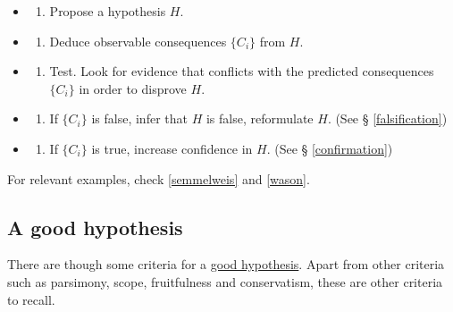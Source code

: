 \documentclass[
]{book}
\providecommand{\tightlist}{%
  \setlength{\itemsep}{0pt}\setlength{\parskip}{0pt}}
\begin{document}
\begin{itemize}
\item
  \begin{enumerate}
  \def\labelenumi{\arabic{enumi}.}
  \tightlist
  \item
    Propose a hypothesis \(H\).
  \end{enumerate}
\item
  \begin{enumerate}
  \def\labelenumi{\arabic{enumi}.}
  \setcounter{enumi}{1}
  \tightlist
  \item
    Deduce observable consequences \(\{C_i\}\) from \(H\).
  \end{enumerate}
\item
  \begin{enumerate}
  \def\labelenumi{\arabic{enumi}.}
  \setcounter{enumi}{2}
  \tightlist
  \item
    Test. Look for evidence that conflicts with the predicted consequences \(\{C_i\}\) in order to disprove \(H\).
  \end{enumerate}
\item
  \begin{enumerate}
  \def\labelenumi{\arabic{enumi}.}
  \setcounter{enumi}{3}
  \tightlist
  \item
    If \(\{C_i\}\) is false, infer that \(H\) is false, reformulate \(H\). (See § \ref{falsification})
  \end{enumerate}
\item
  \begin{enumerate}
  \def\labelenumi{\arabic{enumi}.}
  \setcounter{enumi}{4}
  \tightlist
  \item
    If \(\{C_i\}\) is true, increase confidence in \(H\). (See § \ref{confirmation})
  \end{enumerate}
\end{itemize}

For relevant examples, check \ref{semmelweis} and \ref{wason}.

\hypertarget{a-good-hypothesis}{%
\subsection{A good hypothesis}\label{a-good-hypothesis}}

There are though some criteria for a \href{https://opentext.wsu.edu/carriecuttler/chapter/developing-a-hypothesis/}{good hypothesis}. Apart from other criteria such as parsimony, scope, fruitfulness and conservatism, these are other criteria to recall.
\end{document}
